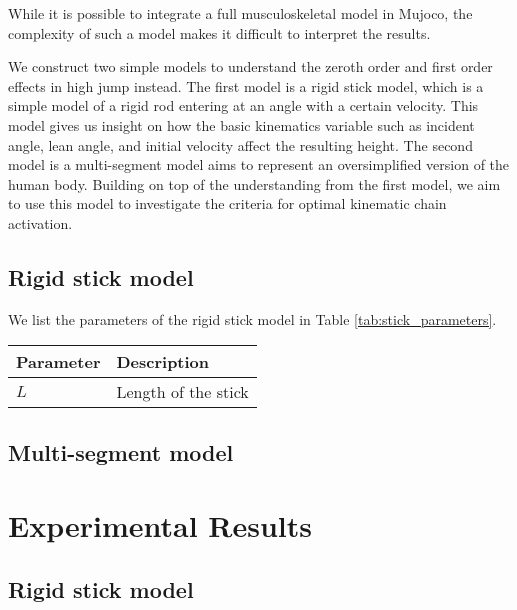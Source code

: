 \documentclass[twocolumn]{aastex631}
\begin{document}
While it is possible to integrate a full musculoskeletal model in Mujoco, the complexity of such a model makes it difficult to interpret the results.

We construct two simple models to understand the zeroth order and first order effects in high jump instead. The first model is a rigid stick model, which is a simple model of a rigid rod entering at an angle with a certain velocity. This model gives us insight on how the basic kinematics variable such as incident angle, lean angle, and initial velocity affect the resulting height. The second model is a multi-segment model aims to represent an oversimplified version of the human body. Building on top of the understanding from the first model, we aim to use this model to investigate the criteria for optimal kinematic chain activation.

\subsection{Rigid stick model}



We list the parameters of the rigid stick model in Table \ref{tab:stick_parameters}.
\begin{table*}[hbt!]
    \begin{center}
    \begin{tabular}{ l l }
    \hline
    \hline
    Parameter &  Description \\
    \hline

    $L$ & Length of the stick \\
    \hline
    \hline
    \end{tabular}
    \caption{}
    \label{tab:stick_parameters}
    \end{center}
\end{table*}

\subsection{Multi-segment model}


\section{Experimental Results}
\label{sec:results}

\subsection{Rigid stick model}
\end{document}
